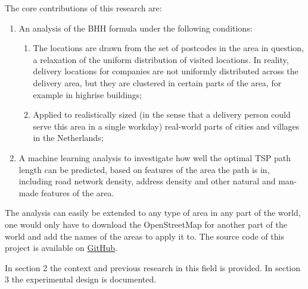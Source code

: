 The core contributions of this research are:
\begin{enumerate}
	\item An analysis of the BHH formula under the following conditions:
	      \begin{enumerate}
		      \item The locations are drawn from the set of postcodes in the area in question, a relaxation of the uniform distribution of visited
		            locations. In reality, delivery locations for companies are not uniformly distributed across the delivery area, but they are clustered
		            in certain parts of the area, for example in highrise buildings;
		      \item Applied to realistically sized (in the sense that a delivery person could serve this area in a single workday) real-world parts of
		            cities and villages in the Netherlands;
	      \end{enumerate}
	\item A machine learning analysis to investigate how well the optimal TSP path length can be
	      predicted, based on features of the area the path is in, including road network density,
	      address density and other natural and man-made features of the area.
\end{enumerate}
The analysis can easily be extended to any type of area in any part of the world, one would only
have to download the OpenStreetMap \citep{openstreetmap} for another part of the world and add the names of the areas
to apply it to. The source code of this project is available on
\href{https://github.com/koen1859/Bsc_Thesis}{GitHub}.

In section 2 the context and previous research in this field is provided.
In section 3 the experimental design is documented.
